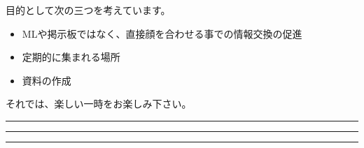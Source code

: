 \documentclass[mingoth,a4paper]{jsarticle}
\begin{document}
 目的として次の三つを考えています。
 \begin{itemize}
  \item MLや掲示板ではなく、直接顔を合わせる事での情報交換の促進
  \item 定期的に集まれる場所
  \item 資料の作成
 \end{itemize}

 それでは、楽しい一時をお楽しみ下さい。

\newpage

\begin{minipage}[b]{0.2\hsize}
 {}
\end{minipage}
\begin{minipage}[b]{0.8\hsize}
\hrule
\vspace{2mm}
\hrule
\setcounter{tocdepth}{1}
\tableofcontents
\vspace{2mm}
\hrule
\end{minipage}

\end{document}
